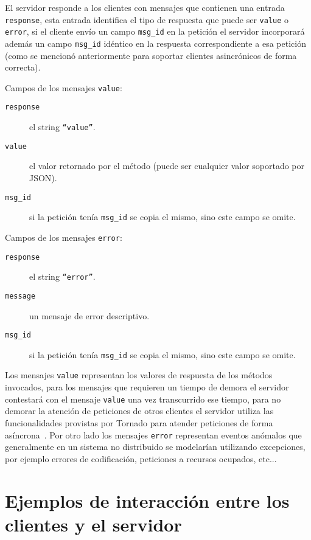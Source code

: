 El servidor responde a los clientes con mensajes que contienen una
entrada \texttt{response}, esta entrada identifica el tipo de respuesta
que puede ser \texttt{value} o \texttt{error}, si el cliente envío un
campo \texttt{msg\_id} en la petición el servidor incorporará además
un campo \texttt{msg\_id} idéntico en la respuesta correspondiente
a esa petición (como se mencionó anteriormente para soportar
clientes asincrónicos de forma correcta).

Campos de los mensajes \texttt{value}:
\begin{description}
    \item[\texttt{response}] el string \texttt{``value''}.
    \item[\texttt{value}] el valor retornado por el método (puede ser
        cualquier valor soportado por JSON).
    \item[\texttt{msg\_id}] si la petición tenía \texttt{msg\_id} se
        copia el mismo, sino este campo se omite.
\end{description}

Campos de los mensajes \texttt{error}:
\begin{description}
    \item[\texttt{response}] el string \texttt{``error''}.
    \item[\texttt{message}] un mensaje de error descriptivo.
    \item[\texttt{msg\_id}] si la petición tenía \texttt{msg\_id} se
        copia el mismo, sino este campo se omite.
\end{description}

Los mensajes \texttt{value} representan los valores de respuesta de
los métodos invocados, para los mensajes que requieren
un tiempo de demora el servidor contestará con el mensaje \texttt{value}
una vez transcurrido ese tiempo, para no demorar la atención de peticiones
de otros clientes el servidor utiliza las funcionalidades provistas por
Tornado para atender peticiones de forma asíncrona~\citep{dory_2012}. Por
otro lado los mensajes \texttt{error} representan eventos anómalos que
generalmente en un sistema no distribuido se modelarían utilizando
excepciones, por ejemplo errores de codificación, peticiones a recursos
ocupados, etc...

\section{Ejemplos de interacción entre los clientes y el servidor}


